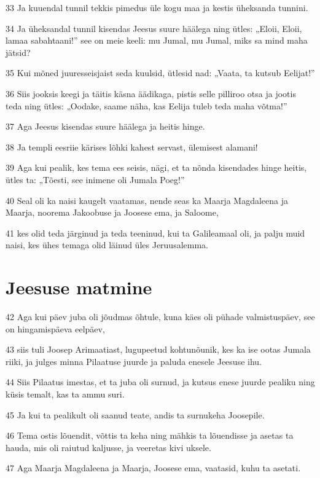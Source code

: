 \par 33 Ja kuuendal tunnil tekkis pimedus üle kogu maa ja kestis üheksanda tunnini.
\par 34 Ja üheksandal tunnil kisendas Jeesus suure häälega ning ütles: „Eloii, Eloii, lamaa sabahtaani!” see on meie keeli: mu Jumal, mu Jumal, miks sa mind maha jätsid?
\par 35 Kui mõned juuresseisjaist seda kuulsid, ütlesid nad: „Vaata, ta kutsub Eelijat!”
\par 36 Siis jooksis keegi ja täitis käsna äädikaga, pistis selle pilliroo otsa ja jootis teda ning ütles: „Oodake, saame näha, kas Eelija tuleb teda maha võtma!”
\par 37 Aga Jeesus kisendas suure häälega ja heitis hinge.
\par 38 Ja templi eesriie kärises lõhki kahest servast, ülemisest alamani!
\par 39 Aga kui pealik, kes tema ees seisis, nägi, et ta nõnda kisendades hinge heitis, ütles ta: „Tõesti, see inimene oli Jumala Poeg!”
\par 40 Seal oli ka naisi kaugelt vaatamas, nende seas ka Maarja Magdaleena ja Maarja, noorema Jakoobuse ja Joosese ema, ja Saloome,
\par 41 kes olid teda järginud ja teda teeninud, kui ta Galileamaal oli, ja palju muid naisi, kes ühes temaga olid läinud üles Jeruusalemma.

\section*{Jeesuse matmine}

\par 42 Aga kui päev juba oli jõudmas õhtule, kuna käes oli pühade valmistuspäev, see on hingamispäeva eelpäev,
\par 43 siis tuli Joosep Arimaatiast, lugupeetud kohtunõunik, kes ka ise ootas Jumala riiki, ja julges minna Pilaatuse juurde ja paluda enesele Jeesuse ihu.
\par 44 Siis Pilaatus imestas, et ta juba oli surnud, ja kutsus enese juurde pealiku ning küsis temalt, kas ta ammu suri.
\par 45 Ja kui ta pealikult oli saanud teate, andis ta surnukeha Joosepile.
\par 46 Tema ostis lõuendit, võttis ta keha ning mähkis ta lõuendisse ja asetas ta hauda, mis oli raiutud kaljusse, ja veeretas kivi uksele.
\par 47 Aga Maarja Magdaleena ja Maarja, Joosese ema, vaatasid, kuhu ta asetati.


